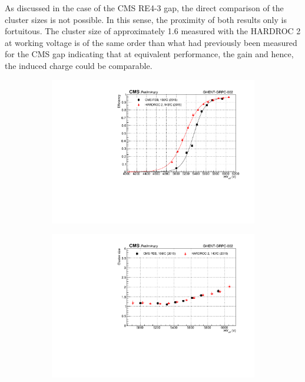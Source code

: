 	As discussed in the case of the CMS RE4-3 gap, the direct comparison of the cluster sizes is not possible. In this sense, the proximity of both results only is fortuitous. The cluster size of approximately 1.6 measured with the HARDROC 2 at working voltage is of the same order than what had previously been measured for the CMS gap indicating that at equivalent performance, the gain and hence, the induced charge could be comparable.
	
	\begin{figure}[H]
		\begin{subfigure}{.5\linewidth}
		    \centering
			\includegraphics[width=\linewidth]{fig/chapt6/gRPC-HARDROC2-Eff-Shift.pdf}
			\caption{\label{fig:HARDROC2-gRPC:A}}
		\end{subfigure}
		\begin{subfigure}{.5\linewidth}
		    \centering
			\includegraphics[width = \linewidth]{fig/chapt6/gRPC-HARDROC2-ClS-Shift.pdf}

\end{subfigure}
\end{figure}

